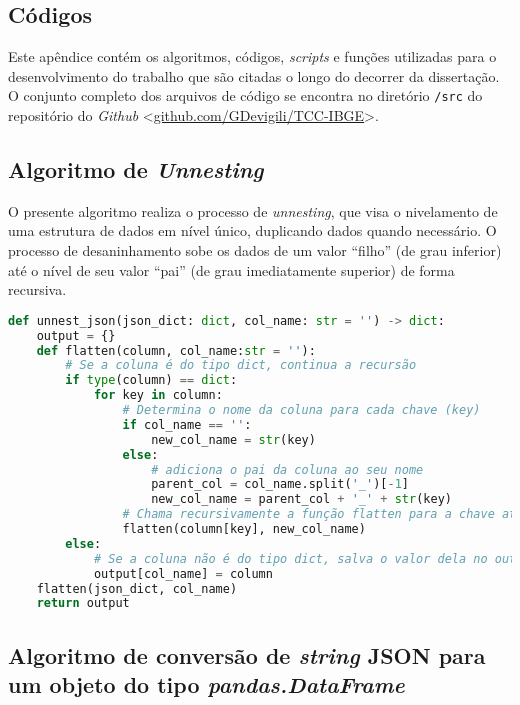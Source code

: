 \setlength{\absparsep}{18pt} 
\begin{apendicesenv}

\chapter{Códigos}
\label{apend-code}

Este apêndice contém os algoritmos, códigos, \textit{scripts} e funções utilizadas para o desenvolvimento do trabalho que são citadas o longo do decorrer da dissertação. O conjunto completo dos arquivos de código se encontra no diretório \verb|/src| do repositório do \textit{Github} <\url{github.com/GDevigili/TCC-IBGE}>.

    \section{Algoritmo de \textit{Unnesting}}
    \label{apend-unnesting}

    O presente algoritmo realiza o processo de \textit{unnesting}, que visa o nivelamento de uma estrutura de dados em nível único, duplicando dados quando necessário. O processo de desaninhamento sobe os dados de um valor ``filho'' (de grau inferior) até o nível de seu valor ``pai'' (de grau imediatamente superior) de forma recursiva. 

\begin{lstlisting}[label={lst:unnesting},language=Python, caption=Algoritmo de \textit{unnesting} em \textit{python}.]
def unnest_json(json_dict: dict, col_name: str = '') -> dict:
    output = {}
    def flatten(column, col_name:str = ''):
        # Se a coluna é do tipo dict, continua a recursão
        if type(column) == dict:
            for key in column:
                # Determina o nome da coluna para cada chave (key)
                if col_name == '':
                    new_col_name = str(key)
                else:
                    # adiciona o pai da coluna ao seu nome
                    parent_col = col_name.split('_')[-1]
                    new_col_name = parent_col + '_' + str(key)
                # Chama recursivamente a função flatten para a chave atual
                flatten(column[key], new_col_name)
        else:
            # Se a coluna não é do tipo dict, salva o valor dela no output
            output[col_name] = column
    flatten(json_dict, col_name)
    return output
\end{lstlisting}


\section{Algoritmo de conversão de \textit{string} JSON para um objeto do tipo \textit{pandas.DataFrame}}


\end{apendicesenv}
